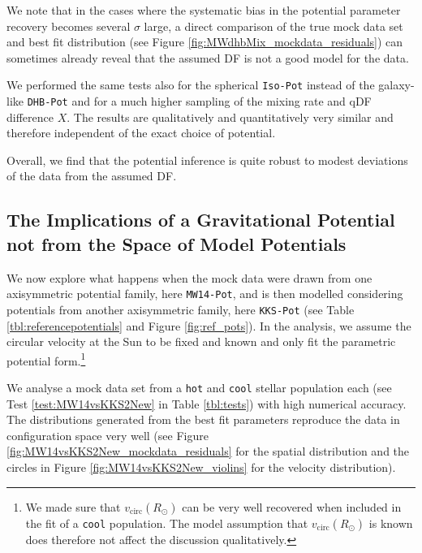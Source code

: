 \documentclass[iop,revtex4,numberedappendix,appendixfloats]{emulateapj}
\begin{document}
We note that in the cases where the systematic bias in the potential parameter recovery becomes several $\sigma$ large, a direct comparison of the true mock data set and best fit distribution (see Figure \ref{fig:MWdhbMix_mockdata_residuals}) can sometimes already reveal that the assumed DF is not a good model for the data.

We performed the same tests also for the spherical \texttt{Iso-Pot} instead of the galaxy-like \texttt{DHB-Pot} and for a much higher sampling of the mixing rate and qDF difference $X$. The results are qualitatively and quantitatively very similar and therefore independent of the exact choice of potential.

Overall, we find that the potential inference is quite robust to modest deviations of the data from the assumed DF. 


\subsection{The Implications of a Gravitational Potential not from the Space of Model Potentials} \label{sec:results_potential}

We now explore what happens when the mock data were drawn from one axisymmetric potential family, here \texttt{MW14-Pot}, and is then modelled considering potentials from another axisymmetric family, here \texttt{KKS-Pot} (see Table \ref{tbl:referencepotentials} and Figure \ref{fig:ref_pots}). In the analysis, we assume the circular velocity at the Sun to be fixed and known and only fit the parametric potential form.\footnote{We made sure that $v_\text{circ}(R_\odot)$ can be very well recovered when included in the fit of a \texttt{cool} population. The model assumption that $v_\text{circ}(R_\odot)$ is known does therefore not affect the discussion qualitatively.}

We analyse a mock data set from a \texttt{hot} and \texttt{cool} stellar population each (see Test \ref{test:MW14vsKKS2New} in Table \ref{tbl:tests}) with high numerical accuracy. The distributions generated from the best fit parameters reproduce the data in configuration space very well (see Figure \ref{fig:MW14vsKKS2New_mockdata_residuals} for the spatial distribution and the circles in Figure \ref{fig:MW14vsKKS2New_violins} for the velocity distribution).
\end{document}
